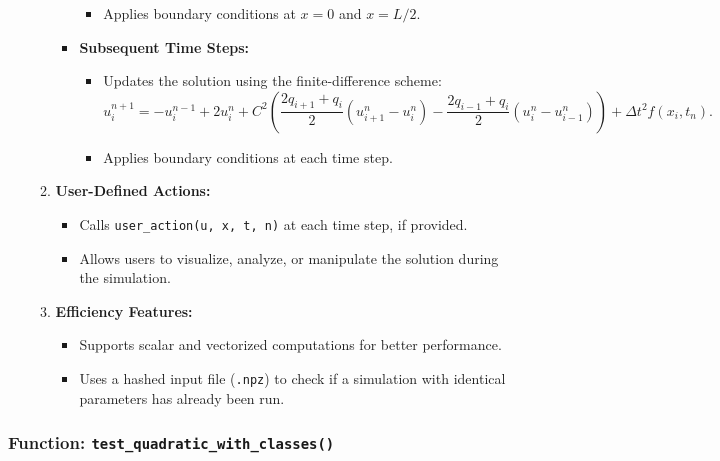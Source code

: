 \documentclass{article}
\begin{document}
\begin{itemize}
\begin{enumerate}
\begin{itemize}
\begin{itemize}
							\item Applies boundary conditions at \( x=0 \) and \( x=L/2 \).
						\end{itemize}
						\item \textbf{Subsequent Time Steps:}
						\begin{itemize}
							\item Updates the solution using the finite-difference scheme:
							\[
							u_i^{n+1} = -u_i^{n-1} + 2u_i^n + C^2 \left( \frac{2q_{i+1} + q_i}{2} (u_{i+1}^n - u_i^n) - \frac{2q_{i-1} + q_i}{2} (u_i^n - u_{i-1}^n) \right) + \Delta t^2 f(x_i, t_n).
							\]
							\item Applies boundary conditions at each time step.
						\end{itemize}
					\end{itemize}
					\item \textbf{User-Defined Actions:}
					\begin{itemize}
						\item Calls \texttt{user\_action(u, x, t, n)} at each time step, if provided.
						\item Allows users to visualize, analyze, or manipulate the solution during the simulation.
					\end{itemize}
					\item \textbf{Efficiency Features:}
					\begin{itemize}
						\item Supports scalar and vectorized computations for better performance.
						\item Uses a hashed input file (\texttt{.npz}) to check if a simulation with identical parameters has already been run.
					\end{itemize}
				\end{enumerate}
			\end{itemize}
		
		\subsubsection{Function: \texttt{test\_quadratic\_with\_classes()}}
			
\end{document}
